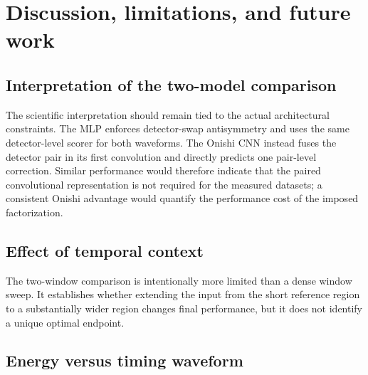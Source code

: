 \section{Discussion, limitations, and future work}

\subsection{Interpretation of the two-model comparison}


The scientific interpretation should remain tied to the actual architectural constraints. The MLP enforces detector-swap antisymmetry and uses the same detector-level scorer for both waveforms. The Onishi CNN instead fuses the detector pair in its first convolution and directly predicts one pair-level correction. Similar performance would therefore indicate that the paired convolutional representation is not required for the measured datasets; a consistent Onishi advantage would quantify the performance cost of the imposed factorization.

\subsection{Effect of temporal context}


The two-window comparison is intentionally more limited than a dense window sweep. It establishes whether extending the input from the short reference region to a substantially wider region changes final performance, but it does not identify a unique optimal endpoint.

\subsection{Energy versus timing waveform}


